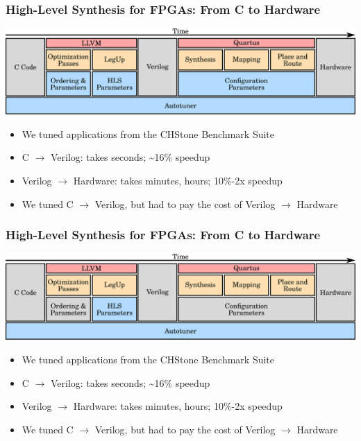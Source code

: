 \documentclass[10pt, compress, aspectratio=169]{beamer}
\begin{document}
\begin{frame}
    \frametitle{High-Level Synthesis for FPGAs: From C to Hardware}
    \begin{center}
        \includegraphics[width=1\textwidth]{fpga-stack-all-colors}
    \end{center}

    \begin{itemize}
        \item We tuned applications from the \alert{CHStone Benchmark Suite}
        \item C $\rightarrow$ Verilog: takes \alert{seconds}; \alert{\textasciitilde16\% speedup}
        \item Verilog $\rightarrow$ Hardware: takes \alert{minutes}, \alert{hours}; \alert{10\%-2x speedup}
        \item We tuned C $\rightarrow$ Verilog, but had \alert{to pay the cost} of Verilog $\rightarrow$ Hardware
    \end{itemize}
\end{frame}

\begin{frame}
    \frametitle{High-Level Synthesis for FPGAs: From C to Hardware}
    \begin{center}
        \includegraphics[width=1\textwidth]{fpga-stack}
    \end{center}

    \begin{itemize}
        \item We tuned applications from the \alert{CHStone Benchmark Suite}
        \item C $\rightarrow$ Verilog: takes \alert{seconds}; \alert{\textasciitilde16\% speedup}
        \item Verilog $\rightarrow$ Hardware: takes \alert{minutes}, \alert{hours}; \alert{10\%-2x speedup}
        \item We tuned C $\rightarrow$ Verilog, but had \alert{to pay the cost} of Verilog $\rightarrow$ Hardware
    \end{itemize}
\end{frame}
\end{document}

